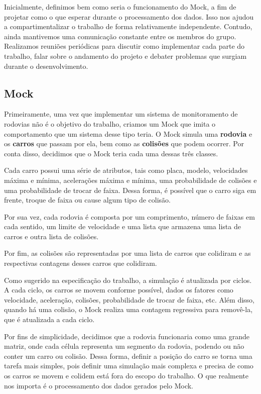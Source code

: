 \documentclass{article}
\begin{document}
    Inicialmente, definimos bem como seria o funcionamento do Mock, a fim de projetar
    como o que esperar durante o processamento dos dados. Isso nos ajudou a 
    compartimentalizar o trabalho de forma relativamente independente. Contudo, ainda
    mantivemos uma comunicação constante entre os membros do grupo. Realizamos reuniões
    periódicas para discutir como implementar cada parte do trabalho, falar sobre o 
    andamento do projeto e debater problemas que surgiam durante o desenvolvimento.

    \subsection*{Mock}
    Primeiramente, uma vez que implementar um sistema de monitoramento de rodovias
    não é o objetivo do trabalho, criamos um Mock que imita o comportamento que um sistema desse tipo teria.
    O Mock simula uma \textbf{rodovia} e os \textbf{carros} que passam por ela, bem como as \textbf{colisões} 
    que podem ocorrer. Por conta disso, decidimos que o Mock teria cada uma dessas três classes.
    
    Cada carro possui uma série de atributos, tais como placa, modelo, velocidades máxima e mínima, 
    acelerações máxima e mínima, uma probabilidade de colisões e uma probabilidade de trocar de faixa.
    Dessa forma, é possível que o carro siga em frente, troque de faixa ou cause algum tipo de colisão.

    Por sua vez, cada rodovia é composta por um comprimento, número de faixas em cada sentido,
    um limite de velocidade e uma lista que armazena uma lista de carros e outra lista de colisões.

    Por fim, as colisões são representadas por uma lista de carros que colidiram e as respectivas
    contagens desses carros que colidiram.

    Como sugerido na especificação do trabalho, a simulação é atualizada por ciclos. A cada ciclo,
    os carros se movem conforme possível, dados os fatores como velocidade, aceleração, colisões,
    probabilidade de trocar de faixa, etc. Além disso, quando há uma colisão, o Mock realiza uma
    contagem regressiva para removê-la, que é atualizada a cada ciclo.

    Por fins de simplicidade, decidimos que a rodovia funcionaria como uma grande matriz, onde cada
    célula representa um segmento da rodovia, podendo ou não conter um carro ou colisão. Dessa forma,
    definir a posição do carro se torna uma tarefa mais simples, pois definir uma simulação mais complexa
    e precisa de como os carros se movem e colidem está fora do escopo do trabalho. O que realmente nos
    importa é o processamento dos dados gerados pelo Mock.
\end{document}
